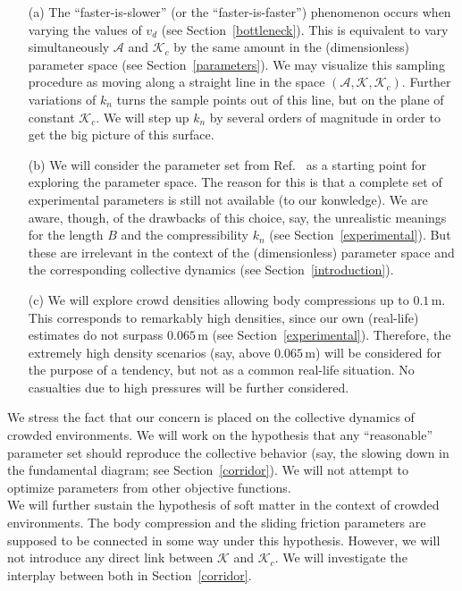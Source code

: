 \documentclass[preprint,12pt]{elsarticle}
\begin{document}
\begin{itemize}
 \item[(a)] The ``faster-is-slower'' (or the ``faster-is-faster'') phenomenon 
occurs when varying the values of $v_d$ (see Section~\ref{bottleneck}). This is 
equivalent to vary simultaneously $\mathcal{A}$ and $\mathcal{K}_c$ by the same 
amount in the (dimensionless) parameter space (see Section~\ref{parameters}). We 
may visualize this sampling procedure as moving along a straight line in the 
space $(\mathcal{A},\mathcal{K},\mathcal{K}_c)$. Further variations of 
$k_n$ turns the sample points out of this line, but on the plane of constant
$\mathcal{K}_c$. We will step up $k_n$ by several orders of magnitude in order 
to get the big picture of this surface. 

\item[(b)] We will consider the parameter set from Ref.~\cite{helbing_2000} 
as a starting point for exploring the parameter space. The reason for this is 
that a complete set of experimental parameters is still not available (to our 
konwledge). We are aware, though, of the drawbacks of this choice, say, the 
unrealistic meanings for the length $B$ and the compressibility $k_n$ (see 
Section~\ref{experimental}). But these are irrelevant in the context of the 
(dimensionless) parameter space and the corresponding collective dynamics (see 
Section~\ref{introduction}). 

\item[(c)] We will explore crowd densities allowing body compressions up to 
$0.1\,$m. This corresponds to remarkably high densities, since our own 
(real-life) estimates do not surpass $0.065\,$m (see 
Section~\ref{experimental}). Therefore, the extremely high density 
scenarios (say, above $0.065\,$m) will be considered for the purpose of a 
tendency, but not as a common real-life situation. No casualties due to high 
pressures will be further considered. 

\end{itemize}

We stress the fact that our concern is placed on the collective dynamics of 
crowded environments. We will work on the hypothesis that any ``reasonable'' 
parameter set should reproduce the collective behavior (say, the slowing down 
in the fundamental diagram; see Section~\ref{corridor}). We will not attempt to 
optimize parameters from other objective functions. \\

We will further sustain the hypothesis of soft matter in the context of crowded 
environments. The body compression and the sliding friction parameters are 
supposed to be connected in some way under this hypothesis. However, we will 
not introduce any direct link between $\mathcal{K}$ and $\mathcal{K}_c$. We 
will investigate the interplay between both in Section~\ref{corridor}. 
\\
\end{document}
